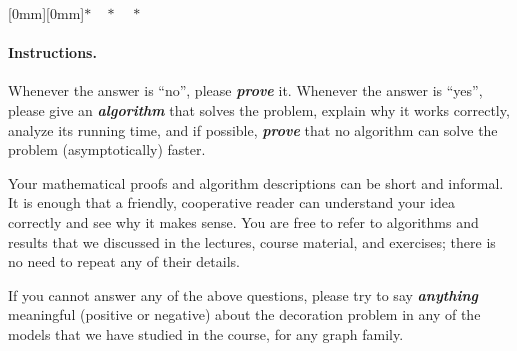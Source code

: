 \documentclass[12pt,a4paper]{article}
\newcommand{\sep}{{\centering \raisebox{-3mm}[0mm][0mm]{$*\quad*\quad*$}\par}}
\newcommand{\cemph}[1]{\textbf{\emph{\boldmath #1}}}
\begin{document}
\sep

\paragraph{Instructions.}

Whenever the answer is ``no'', please \cemph{prove} it. Whenever the answer is ``yes'', please give an \cemph{algorithm} that solves the problem, explain why it works correctly, analyze its running time, and if possible, \cemph{prove} that no algorithm can solve the problem (asymptotically) faster.

Your mathematical proofs and algorithm descriptions can be short and informal. It is enough that a friendly, cooperative reader can understand your idea correctly and see why it makes sense. You are free to refer to algorithms and results that we discussed in the lectures, course material, and exercises; there is no need to repeat any of their details.

If you cannot answer any of the above questions, please try to say \cemph{anything} meaningful (positive or negative) about the decoration problem in any of the models that we have studied in the course, for any graph family.
\end{document}
